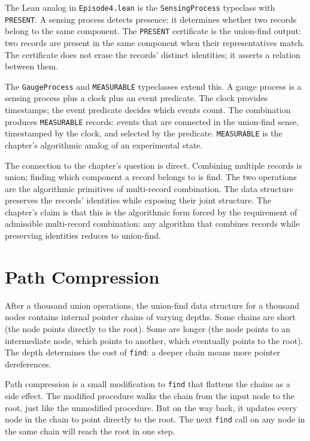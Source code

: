 The Lean analog in \texttt{Episode4.lean} is the
\texttt{SensingProcess} typeclass with \texttt{PRESENT}. A sensing
process detects presence: it determines whether two records belong to
the same component. The \texttt{PRESENT} certificate is the union-find
output: two records are present in the same component when their
representatives match. The certificate does not erase the records'
distinct identities; it asserts a relation between them.

The \texttt{GaugeProcess} and \texttt{MEASURABLE} typeclasses extend
this. A gauge process is a sensing process plus a clock plus an event
predicate. The clock provides timestamps; the event predicate decides
which events count. The combination produces \texttt{MEASURABLE}
records: events that are connected in the union-find sense, timestamped
by the clock, and selected by the predicate. \texttt{MEASURABLE} is
the chapter's algorithmic analog of an experimental state.

The connection to the chapter's question is direct. Combining multiple
records is union; finding which component a record belongs to is find.
The two operations are the algorithmic primitives of multi-record
combination. The data structure preserves the records' identities
while exposing their joint structure. The chapter's claim is that
this is the algorithmic form forced by the requirement of admissible
multi-record combination: any algorithm that combines records while
preserving identities reduces to union-find.

\section{Path Compression}
\label{se:path-compression}

After a thousand union operations, the union-find data structure for a
thousand nodes contains internal pointer chains of varying depths. Some
chains are short (the node points directly to the root). Some are
longer (the node points to an intermediate node, which points to
another, which eventually points to the root). The depth determines the
cost of \texttt{find}: a deeper chain means more pointer dereferences.

Path compression is a small modification to \texttt{find} that
flattens the chains as a side effect. The modified procedure walks the
chain from the input node to the root, just like the unmodified
procedure. But on the way back, it updates every node in the chain to
point directly to the root. The next \texttt{find} call on any node in
the same chain will reach the root in one step.


